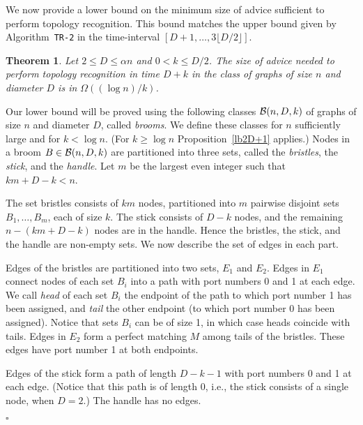\documentclass{article}
\newcommand{\cB}{{\cal B}}
\newcommand*{\qed}{\hfill\ensuremath{\square}}
\newtheorem{theorem}{Theorem}[section]
\newenvironment{proof}{\noindent{\bf Proof:}}{\qed}
\begin{document}
We now provide a lower bound on the minimum size of advice sufficient to perform topology recognition. This bound matches the upper bound given by Algorithm~{\tt TR-2} in the time-interval $[D+1, \ldots, 3\lfloor D/2\rfloor]$.

\begin{theorem}\label{lbD+k}
Let $2\le D\le  \alpha n$ and $0 < k \le  D/2$.
The size of advice needed to perform topology recognition in time $D+k$ in the class of graphs of size $n$ and diameter $D$
is in $\Omega((\log n) / k)$.
\end{theorem}
\begin{proof}
Our lower bound will be proved using the following classes $\cB(n,D,k)$ of graphs of size $n$ and diameter $D$, called {\it brooms}.
We define these classes for $n$ sufficiently large and for $k<\log n$. {(For $k\ge \log n$ Proposition~\ref{lb2D+1} applies.)}
Nodes in a  broom $B \in \cB(n,D,k)$ are partitioned into three sets, called the {\em bristles}, the {\em stick}, and the {\em handle}.
Let $m$ be the largest even integer such that $km + D - k < n$.

The set  bristles consists of $km$ nodes, partitioned into $m$ pairwise disjoint sets $B_1, \ldots,B_m$, each of size $k$. The stick consists of $D-k$ nodes, and the remaining $n - (km + D - k)$ nodes are in the handle.
Hence the bristles, the stick, and the handle are non-empty sets.
We now describe the set of edges in each part.

Edges of the bristles are partitioned into two sets, $E_1$ and $E_2$. 
Edges in $E_1$ connect nodes of each set $B_i$ into a path with port numbers 0 and 1 at each edge. We call  {\it head} of each set $B_i$ the endpoint of the path to which port number 1 has been assigned, and {\it tail} the other  endpoint (to which port number 0 has been assigned).
Notice that sets $B_i$ can be of size 1, in which case heads coincide with tails.
Edges in $E_2$ form a perfect matching $M$ among tails of the bristles. These edges have port number 1 at both endpoints. 

Edges of the stick form a path of length $D-k-1$ with port numbers 0 and 1 at each edge. (Notice that this path is of length 0, i.e., the stick consists of a single node, when $D=2$.) 
The handle has no edges.



\end{proof}
\end{document}
